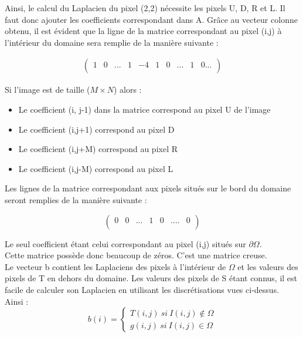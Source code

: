 Ainsi, le calcul du Laplacien du pixel (2,2) nécessite les pixels U, D, R et L. Il faut donc ajouter les coefficients correspondant dans A. Grâce au vecteur colonne obtenu, il est évident que la ligne de la matrice correspondant au pixel (i,j) à l'intérieur du domaine sera remplie de la manière  suivante : 
\begin{center}
\begin{equation}
\left.
\begin{aligned}
\begin{pmatrix}
	1 & 0 & ... &  1 &-4 & 1 & 0 & ... & 1 & 0... \\
\end{pmatrix}
\end{aligned}
\right.
\end{equation}
\end{center}
Si l'image est de taille ($M\times N$) alors : 
\begin{itemize}
\item Le coefficient (i, j-1) dans la matrice correspond au pixel U de l'image
\item Le coefficient (i,j+1) correspond au pixel D
\item Le coefficient (i,j+M) correspond au pixel R
\item Le coefficient (i,j-M) correspond au pixel L
\end{itemize}

Les lignes de la matrice correspondant aux pixels situés sur le bord du domaine seront remplies de la manière suivante : 
\begin{center}
\begin{equation}
\begin{pmatrix}
0 & 0 & ... & 1& 0& ....& 0\\
\end{pmatrix}
\end{equation}
\end{center}
Le seul coefficient étant celui correspondant au pixel (i,j) situés sur $\partial \Omega$. \\
Cette matrice possède donc beaucoup de zéros. C'est une matrice creuse.\\
Le vecteur b contient les Laplaciens des pixels à l'intérieur de $\Omega$ et les valeurs des pixels de T en dehors du domaine. 
Les valeurs des pixels de S étant connus, il est facile de calculer son Laplacien en utilisant les discrétisations vues ci-dessus. Ainsi : 
\begin{equation*}
b(i) = 
\left\{
\begin{aligned}
T(i,j) \ si \ I (i,j) \notin \Omega\\
g(i,j) \ si \ I( i,j) \in \Omega
\end{aligned}
\right.
\end{equation*}

